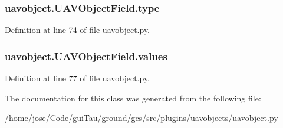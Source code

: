 \hypertarget{classuavobject_1_1_u_a_v_object_field_acc9aa14ec01184df177b6ef907073d1f}{
\subsubsection[{type}]{\setlength{\rightskip}{0pt plus 5cm}uavobject.\-U\-A\-V\-Object\-Field.\-type}}\label{classuavobject_1_1_u_a_v_object_field_acc9aa14ec01184df177b6ef907073d1f}


Definition at line 74 of file uavobject.\-py.

\hypertarget{classuavobject_1_1_u_a_v_object_field_a72f9d575e9fd6eaeb6842377e76ec8fe}{
\subsubsection[{values}]{\setlength{\rightskip}{0pt plus 5cm}uavobject.\-U\-A\-V\-Object\-Field.\-values}}\label{classuavobject_1_1_u_a_v_object_field_a72f9d575e9fd6eaeb6842377e76ec8fe}


Definition at line 77 of file uavobject.\-py.



The documentation for this class was generated from the following file\-:\begin{DoxyCompactItemize}
\item 
/home/jose/\-Code/gui\-Tau/ground/gcs/src/plugins/uavobjects/\hyperlink{uavobject_8py}{uavobject.\-py}\end{DoxyCompactItemize}
